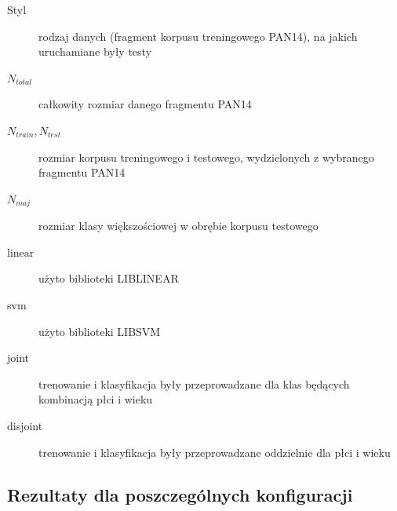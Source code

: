 \documentclass{article}
\begin{document}
\begin{description}

\item[Styl] rodzaj danych (fragment korpusu treningowego PAN14), na jakich uruchamiane były testy \\

\item[$N_{total}$] całkowity rozmiar danego fragmentu PAN14
\item[$N_{train}, N_{test}$] rozmiar korpusu treningowego i testowego, wydzielonych z wybranego fragmentu PAN14
\item[$N_{maj}$] rozmiar klasy większościowej w obrębie korpusu testowego \\

\item[linear] użyto biblioteki LIBLINEAR
\item[svm] użyto biblioteki LIBSVM
\item[joint] trenowanie i klasyfikacja były przeprowadzane dla klas będących kombinacją płci i wieku
\item[disjoint] trenowanie i klasyfikacja były przeprowadzane oddzielnie dla płci i wieku \\

\end{description}

\subsection{Rezultaty dla poszczególnych konfiguracji}
\end{document}
